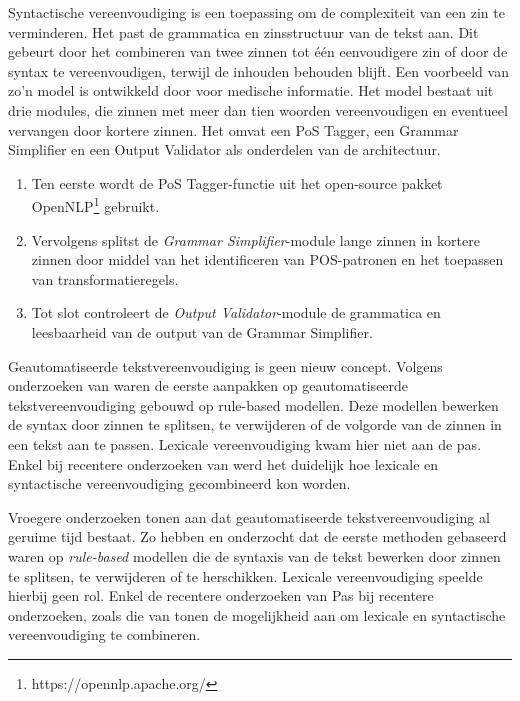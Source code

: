 \medspace

Syntactische vereenvoudiging is een toepassing om de complexiteit van een zin te verminderen. Het past de grammatica en zinsstructuur van de tekst aan. Dit gebeurt door het combineren van twee zinnen tot één eenvoudigere zin of door de syntax te vereenvoudigen, terwijl de inhouden behouden blijft. Een voorbeeld van zo'n model is ontwikkeld door \textcite{Kandula2010} voor medische informatie. Het model bestaat uit drie modules, die zinnen met meer dan tien woorden vereenvoudigen en eventueel vervangen door kortere zinnen. Het omvat een PoS Tagger, een Grammar Simplifier en een Output Validator als onderdelen van de architectuur.

\medspace

\begin{enumerate}
	\item Ten eerste wordt de PoS Tagger-functie uit het open-source pakket OpenNLP\footnote{https://opennlp.apache.org/} gebruikt.
	\item Vervolgens splitst de \textit{Grammar Simplifier}-module lange zinnen in kortere zinnen door middel van het identificeren van POS-patronen en het toepassen van transformatieregels.
	\item Tot slot controleert de \textit{Output Validator}-module de grammatica en leesbaarheid van de output van de Grammar Simplifier.
\end{enumerate}  

\medspace

Geautomatiseerde tekstvereenvoudiging is geen nieuw concept. Volgens onderzoeken van \textcite{Canning2000, Siddharthan2006} waren de eerste aanpakken op geautomatiseerde tekstvereenvoudiging gebouwd op rule-based modellen. Deze modellen bewerken de syntax door zinnen te splitsen, te verwijderen of de volgorde van de zinnen in een tekst aan te passen. Lexicale vereenvoudiging kwam hier niet aan de pas. Enkel bij recentere onderzoeken van \textcite{Coster2011, Bulte2018} werd het duidelijk hoe lexicale en syntactische vereenvoudiging gecombineerd kon worden.

\medspace

Vroegere onderzoeken tonen aan dat geautomatiseerde tekstvereenvoudiging al geruime tijd bestaat. Zo hebben \textcite{Canning2000} en \textcite{Siddharthan2006} onderzocht dat de eerste methoden gebaseerd waren op \textit{rule-based} modellen die de syntaxis van de tekst bewerken door zinnen te splitsen, te verwijderen of te herschikken. Lexicale vereenvoudiging speelde hierbij geen rol. Enkel de recentere onderzoeken van  Pas bij recentere onderzoeken, zoals die van \textcite{Coster2011, Bulte2018} tonen de mogelijkheid aan om lexicale en syntactische vereenvoudiging te combineren.

